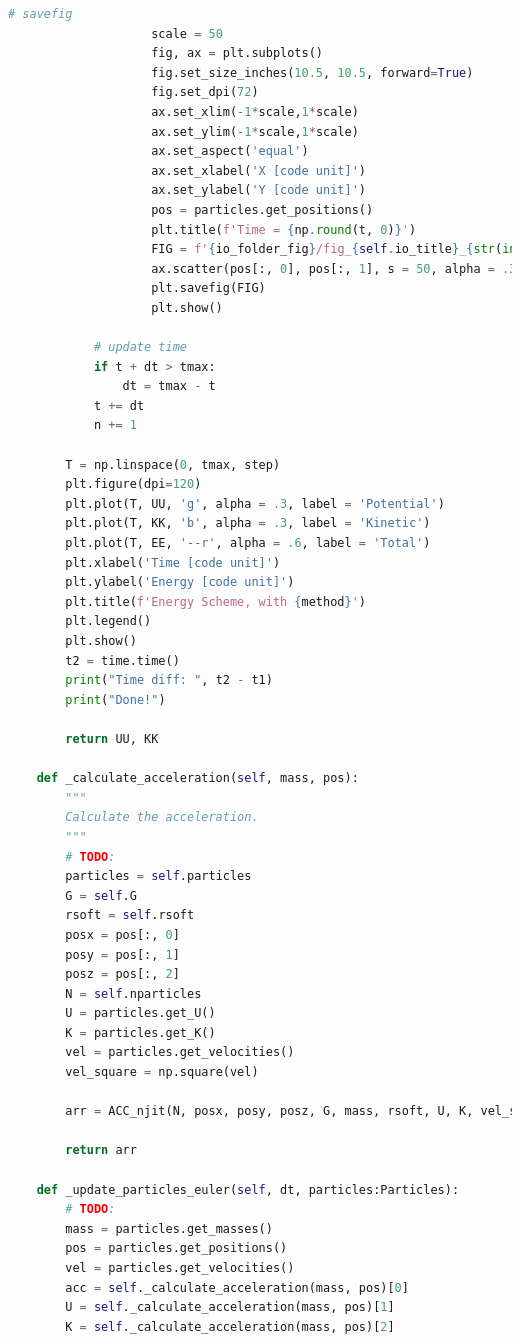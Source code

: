 \documentclass[12pt]{article}
\begin{document}
\begin{lstlisting}[language={Python}]
                    # savefig
                    scale = 50
                    fig, ax = plt.subplots()
                    fig.set_size_inches(10.5, 10.5, forward=True)
                    fig.set_dpi(72)
                    ax.set_xlim(-1*scale,1*scale)
                    ax.set_ylim(-1*scale,1*scale)
                    ax.set_aspect('equal')
                    ax.set_xlabel('X [code unit]')
                    ax.set_ylabel('Y [code unit]')
                    pos = particles.get_positions()
                    plt.title(f'Time = {np.round(t, 0)}')
                    FIG = f'{io_folder_fig}/fig_{self.io_title}_{str(int(0.01 * n)).zfill(1)}.png'
                    ax.scatter(pos[:, 0], pos[:, 1], s = 50, alpha = .3)
                    plt.savefig(FIG)
                    plt.show()
            
            # update time
            if t + dt > tmax:
                dt = tmax - t
            t += dt
            n += 1
        
        T = np.linspace(0, tmax, step)
        plt.figure(dpi=120)
        plt.plot(T, UU, 'g', alpha = .3, label = 'Potential')
        plt.plot(T, KK, 'b', alpha = .3, label = 'Kinetic')
        plt.plot(T, EE, '--r', alpha = .6, label = 'Total')
        plt.xlabel('Time [code unit]')
        plt.ylabel('Energy [code unit]')
        plt.title(f'Energy Scheme, with {method}')
        plt.legend()
        plt.show()
        t2 = time.time()
        print("Time diff: ", t2 - t1)
        print("Done!")
        
        return UU, KK

    def _calculate_acceleration(self, mass, pos):
        """
        Calculate the acceleration.
        """
        # TODO:
        particles = self.particles
        G = self.G
        rsoft = self.rsoft
        posx = pos[:, 0]
        posy = pos[:, 1]
        posz = pos[:, 2]
        N = self.nparticles
        U = particles.get_U()
        K = particles.get_K()
        vel = particles.get_velocities()
        vel_square = np.square(vel)
        
        arr = ACC_njit(N, posx, posy, posz, G, mass, rsoft, U, K, vel_square)
        
        return arr 

    def _update_particles_euler(self, dt, particles:Particles):
        # TODO:
        mass = particles.get_masses()
        pos = particles.get_positions()
        vel = particles.get_velocities()
        acc = self._calculate_acceleration(mass, pos)[0]
        U = self._calculate_acceleration(mass, pos)[1]
        K = self._calculate_acceleration(mass, pos)[2]
        

\end{lstlisting}
\end{document}
